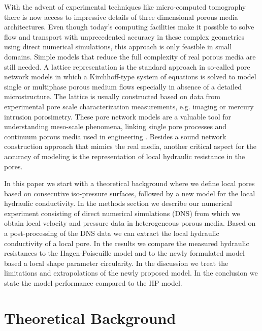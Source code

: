 \documentclass[draft]{agujournal2019}
\begin{document}
With the advent of experimental techniques like micro-computed tomography there is now access to impressive details of three dimensional porous media architectures. Even though today's computing facilities make it possible to solve flow and transport with unprecedented accuracy in these complex geometries using direct numerical simulations, this approach is only feasible in small domains. Simple models that reduce the full complexity of real porous media are still needed. A lattice representation is the standard approach in so-called pore network models in which a Kirchhoff-type system of equations is solved to model single or multiphase porous medium flows \cite{thompson_modeling_1997} especially in absence of a detailed microstructure. The lattice is usually constructed based on data from experimental pore scale characterization measurements, e.g. imaging or mercury intrusion porosimetry. These pore network models are a valuable tool for understanding meso-scale phenomena, linking single pore processes and continuum porous media used in engineering \cite{xiong_review_2016}. Besides a sound network construction approach that mimics the real media, another critical aspect for the accuracy of modeling is the representation of local hydraulic resistance in the pores. 


In this paper we start with a theoretical background where we define local pores based on consecutive iso-pressure surfaces, followed by a new model for the local hydraulic conductivity. In the methods section we describe our numerical experiment consisting of direct numerical simulations (DNS) from which we obtain local velocity and pressure data in heterogeneous porous media. Based on a post-processing of the DNS data we can extract the local hydraulic conductivity of a local pore. In the results we compare the measured hydraulic resistances to the Hagen-Poiseuille model and to the newly formulated model based a local shape parameter circularity. In the discussion we treat the limitations and extrapolations of the newly proposed model. In the conclusion we state the model performance compared to the HP model.



\section{Theoretical Background}
\end{document}

